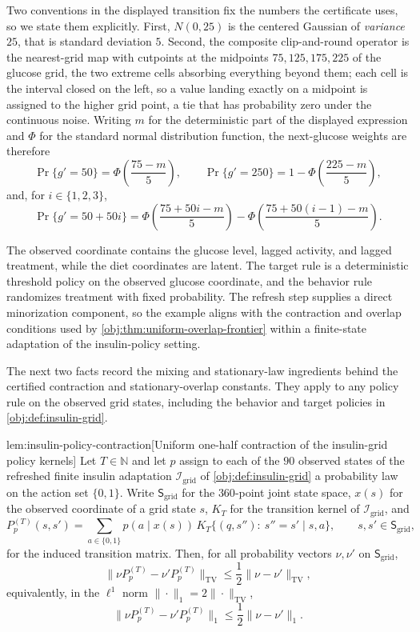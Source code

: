 Two conventions in the displayed transition fix the numbers the certificate uses, so we state them explicitly. First, \(N(0,25)\) is the centered Gaussian of \emph{variance} \(25\), that is standard deviation \(5\). Second, the composite clip-and-round operator is the nearest-grid map with cutpoints at the midpoints \(75,125,175,225\) of the glucose grid, the two extreme cells absorbing everything beyond them; each cell is the interval closed on the left, so a value landing exactly on a midpoint is assigned to the higher grid point, a tie that has probability zero under the continuous noise. Writing \(m\) for the deterministic part of the displayed expression and \(\Phi\) for the standard normal distribution function, the next-glucose weights are therefore
\[
\Pr\{g'=50\}=\Phi\!\left(\frac{75-m}{5}\right),
\qquad
\Pr\{g'=250\}=1-\Phi\!\left(\frac{225-m}{5}\right),
\]
and, for \(i\in\{1,2,3\}\),
\[
\Pr\{g'=50+50i\}
=
\Phi\!\left(\frac{75+50i-m}{5}\right)
-
\Phi\!\left(\frac{75+50(i-1)-m}{5}\right).
\]

The observed coordinate contains the glucose level, lagged activity, and lagged treatment, while the diet coordinates are latent. The target rule is a deterministic threshold policy on the observed glucose coordinate, and the behavior rule randomizes treatment with fixed probability. The refresh step supplies a direct minorization component, so the example aligns with the contraction and overlap conditions used by \cref{obj:thm:uniform-overlap-frontier} within a finite-state adaptation of the insulin-policy setting.

The next two facts record the mixing and stationary-law ingredients behind the certified contraction and stationary-overlap constants. They apply to any policy rule on the observed grid states, including the behavior and target policies in \cref{obj:def:insulin-grid}.

\begin{lemmav}{lem:insulin-policy-contraction}[Uniform one-half contraction of the insulin-grid policy kernels]
Let \(T\in\mathbb N\) and let \(p\) assign to each of the \(90\) observed states of the refreshed finite insulin adaptation \(\mathcal I_{\mathrm{grid}}\) of \cref{obj:def:insulin-grid} a probability law on the action set \(\{0,1\}\). Write \(\mathsf S_{\mathrm{grid}}\) for the \(360\)-point joint state space, \(x(s)\) for the observed coordinate of a grid state \(s\), \(K_T\) for the transition kernel of \(\mathcal I_{\mathrm{grid}}\), and
\[
P_p^{(T)}(s,s')=\sum_{a\in\{0,1\}}p(a\mid x(s))\,K_T\{(q,s''):\ s''=s'\mid s,a\},
\qquad s,s'\in\mathsf S_{\mathrm{grid}},
\]
for the induced transition matrix. Then, for all probability vectors \(\nu,\nu'\) on \(\mathsf S_{\mathrm{grid}}\),
\[
\|\nu P_p^{(T)}-\nu'P_p^{(T)}\|_{\mathrm{TV}}
\le
\frac12\|\nu-\nu'\|_{\mathrm{TV}} ,
\]
equivalently, in the \(\ell^1\) norm \(\|\cdot\|_1=2\|\cdot\|_{\mathrm{TV}}\),
\[
\|\nu P_p^{(T)}-\nu'P_p^{(T)}\|_1\le\frac12\|\nu-\nu'\|_1 .
\]
\end{lemmav}

